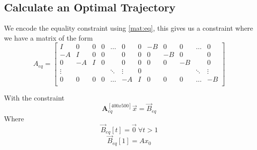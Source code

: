 \subsection{Calculate an Optimal Trajectory}
We encode the equality constraint using \ref{mat:eq}, this gives us a constraint where we have a matrix of the form
\begin{equation}
A_{eq} =
\begin{bmatrix}
    I      & 0  & 0 & 0 & \hdots & 0      & 0  & -B & 0  & 0  & \hdots & 0\\
    -A     & I  & 0 & 0 &        & 0      & 0  & 0  & -B & 0  &        & 0\\
    0      & -A & I & 0 &        & 0      & 0  & 0  & 0  & -B &        & 0\\
    \vdots &    &   &   & \ddots & \vdots & 0  &    &    &    & \ddots & \vdots\\
    0      & 0  & 0 & 0 & \hdots & -A     & I  & 0  & 0  & 0  & \hdots & -B\\
\end{bmatrix}
\end{equation}

With the constraint
\begin{equation}
\mathbf{A}_{eq}^{[400x500]} \vec{x} = \vec{B}_{eq}
\end{equation}
Where
\begin{equation}
\vec{B}_{eq}[t] = \vec{0}\ \forall t > 1
\end{equation}
\begin{equation}
\vec{B}_{eq}[1] = Ax_0
\end{equation}

